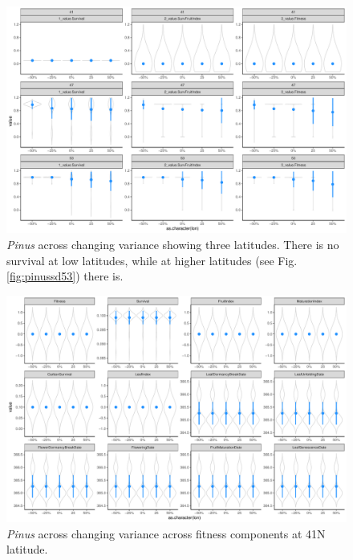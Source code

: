 \documentclass[11pt,letter]{article}
\begin{document}
\clearpage

\begin{figure} 
 \begin{center}
\noindent \includegraphics[width=1\textwidth]{..//analyses/graphs/phenofit/sims/metrics3/sdsim_3metricsPS.pdf}
  \caption{\emph{Pinus} across changing variance showing three latitudes. There is no survival at low latitudes, while at higher latitudes (see Fig. \ref{fig:pinussd53}) there is.}
  \label{fig:pinussd3}
  \end{center}
\end{figure}

\begin{figure} 
 \begin{center}
\noindent \includegraphics[width=1\textwidth]{..//analyses/graphs/phenofit/sims/sdsim41_allmetricsPS.pdf}
  \caption{\emph{Pinus} across changing variance across fitness components at 41\degree N latitude.}
  \label{fig:pinussd41}
  \end{center}
\end{figure}
\end{document}
